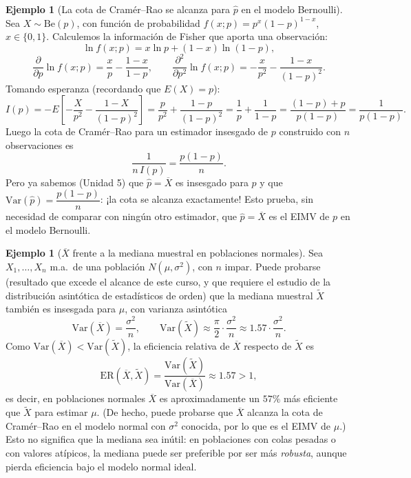 \documentclass[11pt,a4paper]{article}
\theoremstyle{plain}
\theoremstyle{definition}
\newtheorem{ejemplo}[teorema]{Ejemplo}
\theoremstyle{remark}
\begin{document}
\begin{ejemplo}[La cota de Cramér--Rao se alcanza para $\widehat p$ en el modelo Bernoulli]
Sea $X\sim \text{Be}(p)$, con función de probabilidad $f(x;p)=p^x(1-p)^{1-x}$, $x\in\{0,1\}$. Calculemos la información de Fisher que aporta una observación:
\[
\ln f(x;p) = x\ln p + (1-x)\ln(1-p),
\]
\[
\frac{\partial}{\partial p}\ln f(x;p) = \frac{x}{p}-\frac{1-x}{1-p}, \qquad \frac{\partial^2}{\partial p^2}\ln f(x;p) = -\frac{x}{p^2}-\frac{1-x}{(1-p)^2}.
\]
Tomando esperanza (recordando que $E(X)=p$):
\[
I(p) = -E\left[-\frac{X}{p^2}-\frac{1-X}{(1-p)^2}\right] = \frac{p}{p^2}+\frac{1-p}{(1-p)^2} = \frac1p+\frac{1}{1-p} = \frac{(1-p)+p}{p(1-p)} = \frac{1}{p(1-p)}.
\]
Luego la cota de Cramér--Rao para un estimador insesgado de $p$ construido con $n$ observaciones es
\[
\frac{1}{n\,I(p)} = \frac{p(1-p)}{n}.
\]
Pero ya sabemos (Unidad 5) que $\widehat p = \overline X$ es insesgado para $p$ y que $\mathrm{Var}(\widehat p) = \dfrac{p(1-p)}{n}$: ¡la cota se alcanza exactamente! Esto prueba, sin necesidad de comparar con ningún otro estimador, que $\widehat p=\overline X$ es el EIMV de $p$ en el modelo Bernoulli.
\end{ejemplo}

\begin{ejemplo}[$\overline X$ frente a la mediana muestral en poblaciones normales]
Sea $X_1,\dots,X_n$ m.a.\ de una población $N(\mu,\sigma^2)$, con $n$ impar. Puede probarse (resultado que excede el alcance de este curso, y que requiere el estudio de la distribución asintótica de estadísticos de orden) que la mediana muestral $\widetilde X$ también es insesgada para $\mu$, con varianza asintótica
\[
\mathrm{Var}(\overline X) = \frac{\sigma^2}{n}, \qquad \mathrm{Var}(\widetilde X)\approx \frac{\pi}{2}\cdot\frac{\sigma^2}{n} \approx 1.57\cdot\frac{\sigma^2}{n}.
\]
Como $\mathrm{Var}(\overline X)<\mathrm{Var}(\widetilde X)$, la eficiencia relativa de $\overline X$ respecto de $\widetilde X$ es
\[
\mathrm{ER}(\overline X,\widetilde X) = \frac{\mathrm{Var}(\widetilde X)}{\mathrm{Var}(\overline X)} \approx 1.57 > 1,
\]
es decir, en poblaciones normales $\overline X$ es aproximadamente un $57\%$ más eficiente que $\widetilde X$ para estimar $\mu$. (De hecho, puede probarse que $\overline X$ alcanza la cota de Cramér--Rao en el modelo normal con $\sigma^2$ conocida, por lo que es el EIMV de $\mu$.) Esto no significa que la mediana sea inútil: en poblaciones con colas pesadas o con valores atípicos, la mediana puede ser preferible por ser más \emph{robusta}, aunque pierda eficiencia bajo el modelo normal ideal.
\end{ejemplo}
\end{document}
